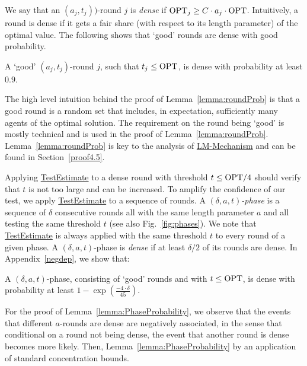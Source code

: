 We say that an $\left(a_j,t_j\right))$-round $j$ is \emph{dense} if $\mathrm{OPT}_j \geq C \cdot a_j \cdot \mathrm{OPT}$. Intuitively, a round is dense if it gets a fair share (with respect to its length parameter) of the optimal value. The following shows that `good' rounds are dense with good probability. 

\begin{lemma}\label{lemma:roundProb}
A  `good' $\left(a_j,t_j\right)$-round $j$, such that $t_j\le \mathrm{OPT}$, is dense with probability at least $0.9$.
\end{lemma}

The high level intuition behind the proof of Lemma~\ref{lemma:roundProb} is that a good round is a random set that includes, in expectation, sufficiently many agents of the optimal solution. The requirement on the round being `good' is mostly technical and is used in the proof of Lemma~\ref{lemma:roundProb}. Lemma~\ref{lemma:roundProb} is key to the  analysis of \hyperref[alg:LMMECH]{LM-Mechanism} and can be found in Section~\ref{proof4.5}.


Applying \hyperref[alg:TestTHRESHOLD]{TestEstimate} to a dense round with threshold $t \leq \mathrm{OPT} / 4$ should verify that $t$ is not too large and can be increased. To amplify the confidence of our test, we apply \hyperref[alg:TestTHRESHOLD]{TestEstimate} to a sequence of rounds. A \emph{$\left(\delta,a,t\right)$-phase} is a sequence of $\delta$ consecutive rounds all with the same length parameter $a$ and all testing the same threshold $t$ (see also Fig.~\ref{fig:phases}). 
%
We note that \hyperref[alg:TestTHRESHOLD]{TestEstimate} is always applied with the same threshold $t$ to every round of a given phase.
%
A $\left(\delta,a,t\right)$-phase is \emph{dense} if at least $\delta / 2$ of its rounds are dense. In Appendix~\ref{negdep}, we show that: 

\begin{lemma}\label{lemma:PhaseProbability}
A $\left(\delta,a,t\right)$-phase, consisting of `good' rounds and with $t\le \mathrm{OPT}$, is dense with probability at least $1-\exp(\frac{-4\cdot\delta}{45})$.
\end{lemma}

For the proof of Lemma~\ref{lemma:PhaseProbability}, we observe that the events that different $a$-rounds are dense are negatively associated, in the sense that conditional on a round not being dense, the event that another round is dense becomes more likely. Then, Lemma~\ref{lemma:PhaseProbability} by an application of standard concentration bounds. 

